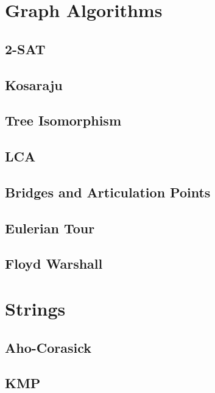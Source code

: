 \section{Graph Algorithms}
\subsection{2-SAT}
\raggedbottom
\hrulefill
\subsection{Kosaraju}
\raggedbottom
\hrulefill
\subsection{Tree Isomorphism}
\raggedbottom
\hrulefill
\subsection{LCA}
\raggedbottom
\hrulefill
\subsection{Bridges and Articulation Points}
\raggedbottom
\hrulefill
\subsection{Eulerian Tour}
\raggedbottom
\hrulefill
\subsection{Floyd Warshall}
\raggedbottom
\hrulefill

\section{Strings}
\subsection{Aho-Corasick}
\raggedbottom
\hrulefill
\subsection{KMP}
\raggedbottom
\hrulefill
